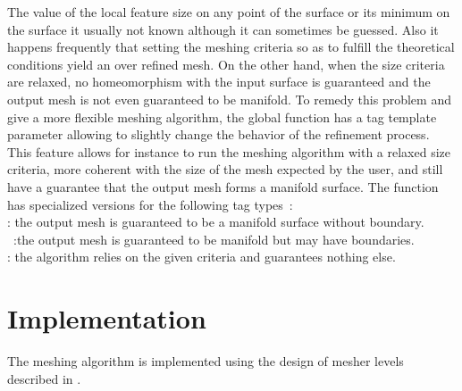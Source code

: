 The value of the local feature size on any point of the surface
or its minimum on the surface it usually not known
although it can sometimes be guessed. Also it happens frequently
that setting the meshing criteria so as to fulfill the theoretical
conditions yield an over refined mesh.
On the other hand, when the size criteria are relaxed,
no homeomorphism with the input surface is guaranteed
and the output mesh is not even guaranteed to be manifold.
To remedy this problem and give a more flexible
meshing algorithm, the global function 
 has a tag template parameter
allowing to slightly change the behavior of the refinement process.
This feature allows for instance to run the meshing
algorithm with a relaxed size criteria, more coherent
with the size of the mesh expected by the user,
and still have a guarantee that
the output mesh forms a manifold surface.
The function  has specialized versions
for the following  tag types~: \\
 : the output mesh is guaranteed to be a manifold
surface without boundary.\\
~:the output mesh is guaranteed to be
manifold but may have boundaries.\\
 : the algorithm relies on the given criteria and
guarantees nothing else.

\section{Implementation}

The meshing algorithm is implemented using the design of mesher levels
described in \cite{Rineau-and-co}. 




